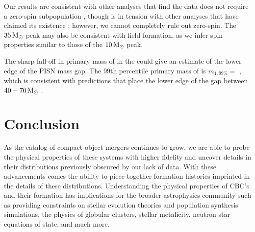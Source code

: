 Our results are consistent with other analyses that find the data does not require a zero-spin subpopulation \citep{arXiv2205.08574,2301.01312}, though is in tension with other analyses that have claimed its existence \citep{doi.org/10.3847/2041-8213/ac2f3c,2105.10580}; however, we cannot completely rule out zero-spin. The $35{\,\rm M}_\odot$ peak may also be consistent with field formation, as we infer spin properties similar to those of the $10{\,\rm M}_\odot$ peak. 

The sharp fall-off in primary mass of \contA{} in the \comp{} could give an estimate of the lower edge of the PISN mass gap. The 99th percentile primary mass of \contA{} is $m_{1,99\%} = $ \result{$\CIPlusMinus{\macros[Mass][Composite][ContinuumA][99percentile]}$ \msun}, which is consistent with predictions that place the lower edge of the gap between $40-70{\,\rm M}_\odot$ \citep{1901.00215,1910.12874v1,2103.07933v1,2104.07783v2}. 

\section{Conclusion} \label{sec:conclusion}


As the catalog of compact object mergers continues to grow, we are able to probe the physical properties of these systems with higher fidelity and uncover details in their distributions previously obscured by our lack of data. With these advancements comes the ability to piece together formation histories imprinted in the details of these distributions. Understanding the physical properties of CBC's and their formation has implications for the broader astrophysics community such as providing constraints on stellar evolution theories and population synthesis simulations, the physics of globular clusters, stellar metalicity, neutron star equations of state, and much more. 

